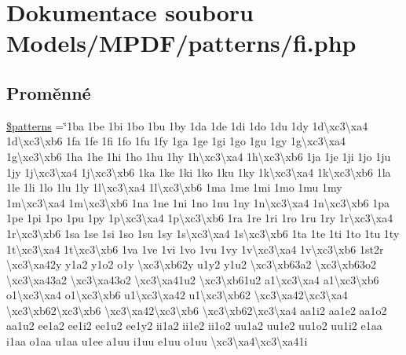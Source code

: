 \hypertarget{fi_8php}{\section{Dokumentace souboru Models/\-M\-P\-D\-F/patterns/fi.php}
\label{fi_8php}
}
\subsection*{Proměnné}
\begin{DoxyCompactItemize}
\item 
\hyperlink{fi_8php_a99c668c59ad650ca9b31ad5313dc5720}{\$patterns} =\char`\"{}1ba 1be 1bi 1bo 1bu 1by 1da 1de 1di 1do 1du 1dy 1d\textbackslash{}xc3\textbackslash{}xa4 1d\textbackslash{}xc3\textbackslash{}xb6 1fa 1fe 1fi 1fo 1fu 1fy 1ga 1ge 1gi 1go 1gu 1gy 1g\textbackslash{}xc3\textbackslash{}xa4 1g\textbackslash{}xc3\textbackslash{}xb6 1ha 1he 1hi 1ho 1hu 1hy 1h\textbackslash{}xc3\textbackslash{}xa4 1h\textbackslash{}xc3\textbackslash{}xb6 1ja 1je 1ji 1jo 1ju 1jy 1j\textbackslash{}xc3\textbackslash{}xa4 1j\textbackslash{}xc3\textbackslash{}xb6 1ka 1ke 1ki 1ko 1ku 1ky 1k\textbackslash{}xc3\textbackslash{}xa4 1k\textbackslash{}xc3\textbackslash{}xb6 1la 1le 1li 1lo 1lu 1ly 1l\textbackslash{}xc3\textbackslash{}xa4 1l\textbackslash{}xc3\textbackslash{}xb6 1ma 1me 1mi 1mo 1mu 1my 1m\textbackslash{}xc3\textbackslash{}xa4 1m\textbackslash{}xc3\textbackslash{}xb6 1na 1ne 1ni 1no 1nu 1ny 1n\textbackslash{}xc3\textbackslash{}xa4 1n\textbackslash{}xc3\textbackslash{}xb6 1pa 1pe 1pi 1po 1pu 1py 1p\textbackslash{}xc3\textbackslash{}xa4 1p\textbackslash{}xc3\textbackslash{}xb6 1ra 1re 1ri 1ro 1ru 1ry 1r\textbackslash{}xc3\textbackslash{}xa4 1r\textbackslash{}xc3\textbackslash{}xb6 1sa 1se 1si 1so 1su 1sy 1s\textbackslash{}xc3\textbackslash{}xa4 1s\textbackslash{}xc3\textbackslash{}xb6 1ta 1te 1ti 1to 1tu 1ty 1t\textbackslash{}xc3\textbackslash{}xa4 1t\textbackslash{}xc3\textbackslash{}xb6 1va 1ve 1vi 1vo 1vu 1vy 1v\textbackslash{}xc3\textbackslash{}xa4 1v\textbackslash{}xc3\textbackslash{}xb6 1st2r \textbackslash{}xc3\textbackslash{}xa42y y1a2 y1o2 o1y \textbackslash{}xc3\textbackslash{}xb62y u1y2 y1u2 \textbackslash{}xc3\textbackslash{}xb63a2 \textbackslash{}xc3\textbackslash{}xb63o2 \textbackslash{}xc3\textbackslash{}xa43a2 \textbackslash{}xc3\textbackslash{}xa43o2 \textbackslash{}xc3\textbackslash{}xa41u2 \textbackslash{}xc3\textbackslash{}xb61u2 a1\textbackslash{}xc3\textbackslash{}xa4 a1\textbackslash{}xc3\textbackslash{}xb6 o1\textbackslash{}xc3\textbackslash{}xa4 o1\textbackslash{}xc3\textbackslash{}xb6 u1\textbackslash{}xc3\textbackslash{}xa42 u1\textbackslash{}xc3\textbackslash{}xb62 \textbackslash{}xc3\textbackslash{}xa42\textbackslash{}xc3\textbackslash{}xa4 \textbackslash{}xc3\textbackslash{}xb62\textbackslash{}xc3\textbackslash{}xb6 \textbackslash{}xc3\textbackslash{}xa42\textbackslash{}xc3\textbackslash{}xb6 \textbackslash{}xc3\textbackslash{}xb62\textbackslash{}xc3\textbackslash{}xa4 aa1i2 aa1e2 aa1o2 aa1u2 ee1a2 ee1i2 ee1u2 ee1y2 ii1a2 ii1e2 ii1o2 uu1a2 uu1e2 uu1o2 uu1i2 e1aa i1aa o1aa u1aa u1ee a1uu i1uu e1uu o1uu \textbackslash{}xc3\textbackslash{}xa4\textbackslash{}xc3\textbackslash{}xa41i 
\end{DoxyCompactItemize}
